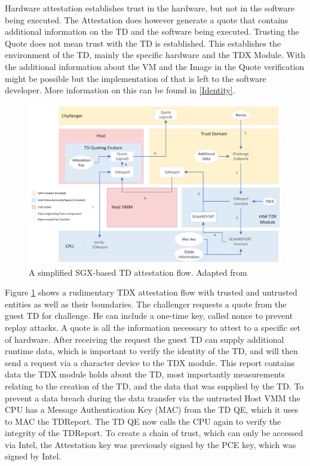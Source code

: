 Hardware attestation establishes trust in the hardware, but not in the software being executed. The Attestation does however generate a quote that contains additional information on the TD and the software being executed. Trusting the Quote does not mean trust with the TD is established. This establishes the environment of the TD, mainly the specific hardware and the TDX Module. With the additional information about the VM and the Image in the Quote verification might be possible but the implementation of that is left to the software developer. More information on this can be found in \cref{Identity}.
\begin{figure}
\centering
\includegraphics[width=\textwidth]{figures/Attestation-einfach.png}
\caption{A simplified SGX-based TD attestation flow. Adapted from \cite[p.~111]{noauthor_tdx-module-10-public-specpdf_nodate}}
\label{fig:EasyAttestation}
\end{figure}
Figure \ref{fig:EasyAttestation} shows a rudimentary TDX attestation flow with trusted and untrusted entities as well as their boundaries. The challenger requests a quote from the guest TD for challenge. He can include a one-time key, called nonce to prevent replay attacks. A quote is all the information necessary to attest to a specific set of hardware. After receiving the request the guest TD can supply additional runtime data, which is important to verify the identity of the TD, and will then send a request via a character device to the TDX module. This report contains data the TDX module holds about the TD, most importantly measurements relating to the creation of the TD, and the data that was supplied by the TD. To prevent a data breach during the data transfer via the untrusted Host VMM the CPU has a Message Authentication Key (MAC) from the TD QE, which it uses to MAC the TDReport. The TD QE now calls the CPU again to verify the integrity of the TDReport.
To create a chain of trust, which can only be accessed via Intel, the Attestation key was previously signed by the PCE key, which was signed by Intel. 

